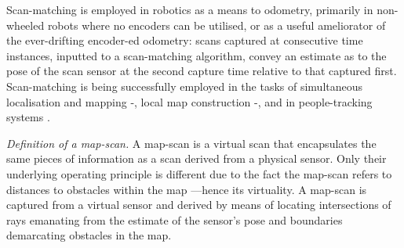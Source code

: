 \begin{remark}
  Scan-matching is employed in robotics as a means to odometry,
  primarily in non-wheeled robots where no encoders can be utilised, or as a
  useful ameliorator of the ever-drifting encoder-ed odometry: scans captured at
  consecutive time instances, inputted to a scan-matching algorithm, convey an
  estimate as to the pose of the scan sensor at the second capture time
  relative to that captured first. Scan-matching is being successfully employed
  in the tasks of simultaneous localisation and mapping
  \cite{am_odom_1}-\cite{am_odom_3}, local map construction
  \cite{am_odom_4}-\cite{am_odom_6}, and in people-tracking systems
  \cite{am_odom_7}.
\end{remark}

\begin{definition}
  \label{def:definition_3}
  \textit{Definition of a map-scan.}
  A map-scan is a virtual scan that encapsulates the same pieces of information
  as a scan derived from a physical sensor. Only their underlying operating
  principle is different due to the fact the map-scan refers to distances to
  obstacles within the map ---hence its virtuality. A map-scan is captured from
  a virtual sensor and derived by means of locating intersections of rays
  emanating from the estimate of the sensor's pose and boundaries demarcating
  obstacles in the map.
\end{definition}
